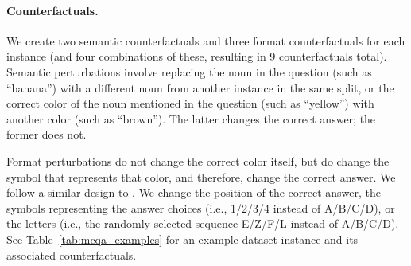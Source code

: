 \documentclass{article}
\theoremstyle{plain}
\theoremstyle{definition}
\theoremstyle{remark}
\begin{document}
\paragraph{Counterfactuals.}
We create two semantic counterfactuals and three format counterfactuals for each instance (and four combinations of these, resulting in 9 counterfactuals total). Semantic perturbations involve replacing the noun in the question (such as ``banana'') with a different noun  from another instance in the same split, or the correct color of the noun mentioned in the question (such as ``yellow'') with another color (such as ``brown''). The latter changes the correct answer; the former does not. 

Format perturbations do not change the correct color itself, but do change the symbol that represents that color, and therefore, change the correct answer. We follow a similar design to \citet{lieberum2023does}. We change the position of the correct answer, the symbols representing the answer choices (i.e., 1/2/3/4 instead of A/B/C/D), or the letters (i.e., the randomly selected sequence E/Z/F/L instead of A/B/C/D). 
See Table~\ref{tab:mcqa_examples} for an example dataset instance and its associated counterfactuals.
\end{document}
